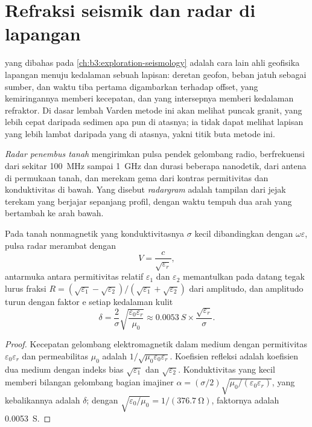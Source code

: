 \section{Refraksi seismik dan radar di lapangan}\label{sec:b3:field-lab-methods-3:radar}

 yang dibahas pada \cref{ch:b3:exploration-seismology}
adalah cara lain ahli geofisika lapangan menuju kedalaman sebuah lapisan: deretan
geofon, beban jatuh sebagai sumber, dan waktu tiba pertama
digambarkan terhadap offset, yang kemiringannya memberi kecepatan, dan yang
intersepnya memberi kedalaman refraktor. Di dasar lembah Varden metode ini
akan melihat puncak granit, yang lebih cepat daripada sedimen apa pun di atasnya; ia
tidak dapat melihat lapisan yang lebih lambat daripada yang di atasnya, yakni titik
buta metode ini.

\begin{definition}\label{def:b3:field-lab-methods-3:gpr}
\emph{Radar penembus tanah} mengirimkan
pulsa pendek gelombang radio, berfrekuensi dari sekitar \qty{100}{MHz}
sampai \qty{1}{GHz} dan durasi beberapa nanodetik, dari antena di
permukaan tanah, dan merekam gema dari kontras permitivitas dan
konduktivitas di bawah. Yang disebut \emph{radargram} adalah tampilan
dari jejak terekam yang berjajar sepanjang profil, dengan waktu tempuh
dua arah yang bertambah ke arah bawah.
\end{definition}

\begin{proposition}\label{prop:b3:field-lab-methods-3:radar}
Pada tanah nonmagnetik yang konduktivitasnya $\sigma$ kecil dibandingkan
dengan $\omega\varepsilon$, pulsa radar merambat dengan
\[
V = \frac{c}{\sqrt{\varepsilon_r}} ,
\]
antarmuka antara permitivitas relatif $\varepsilon_1$ dan
$\varepsilon_2$ memantulkan pada datang tegak lurus fraksi $R =
(\sqrt{\varepsilon_1} - \sqrt{\varepsilon_2})/(\sqrt{\varepsilon_1} +
\sqrt{\varepsilon_2})$ dari amplitudo, dan amplitudo turun
dengan faktor $\mathrm{e}$ setiap kedalaman kulit
\[
\delta = \frac{2}{\sigma}\sqrt{\frac{\varepsilon_0\varepsilon_r}{\mu_0}}
       \approx \qty{0.0053}{S}\times\frac{\sqrt{\varepsilon_r}}{\sigma} .
\]
\end{proposition}

\begin{proof}
Kecepatan gelombang elektromagnetik dalam medium dengan permitivitas
$\varepsilon_0\varepsilon_r$ dan permeabilitas $\mu_0$ adalah
$1/\sqrt{\mu_0\varepsilon_0\varepsilon_r}$. Koefisien refleksi
adalah koefisien dua medium dengan indeks bias $\sqrt{\varepsilon_1}$ dan
$\sqrt{\varepsilon_2}$. Konduktivitas yang kecil memberi bilangan gelombang
bagian imajiner $\alpha = (\sigma/2)\sqrt{\mu_0/(\varepsilon_0
\varepsilon_r)}$, yang kebalikannya adalah $\delta$; dengan $\sqrt{\varepsilon_0/
\mu_0} = 1/(\qty{376.7}{\ohm})$, faktornya adalah \qty{0.0053}{S}.
\end{proof}

